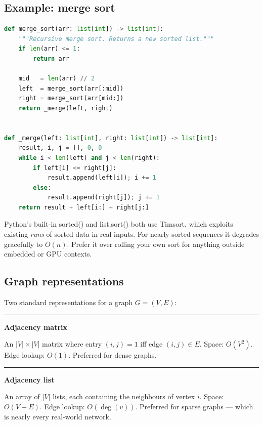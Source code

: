 \documentclass[12pt,a4paper]{article}
\newcommand{\ic}[1]{%
  \mbox{\colorbox{AnthCodeBG}{\footnotesize\ttfamily\textcolor{AnthBlue}{#1}}}%
}
\newcommand{\concept}[1]{%
  \noindent\textcolor{AnthGreen}{\rule{3pt}{10pt}}\enspace
  \textbf{\color{AnthDark}#1}\par\vspace{2pt}%
}
\newenvironment{Tip}[1][Tip]{%
  \begin{tcolorbox}[tipbox, title=#1]}{\end{tcolorbox}}
\begin{document}
\subsection{Example: merge sort}

\begin{tcolorbox}[codebox, title=Merge sort — Python]
\begin{lstlisting}[language=Python]
def merge_sort(arr: list[int]) -> list[int]:
    """Recursive merge sort. Returns a new sorted list."""
    if len(arr) <= 1:
        return arr

    mid   = len(arr) // 2
    left  = merge_sort(arr[:mid])
    right = merge_sort(arr[mid:])
    return _merge(left, right)


def _merge(left: list[int], right: list[int]) -> list[int]:
    result, i, j = [], 0, 0
    while i < len(left) and j < len(right):
        if left[i] <= right[j]:
            result.append(left[i]); i += 1
        else:
            result.append(right[j]); j += 1
    return result + left[i:] + right[j:]
\end{lstlisting}
\end{tcolorbox}

\begin{Tip}[When to use Timsort]
  Python's built-in \ic{sorted()} and \ic{list.sort()} both use Timsort, which
  exploits existing \emph{runs} of sorted data in real inputs. For nearly-sorted
  sequences it degrades gracefully to $O(n)$. Prefer it over rolling your own
  sort for anything outside embedded or GPU contexts.
\end{Tip}

\subsection{Graph representations}

Two standard representations for a graph $G = (V, E)$:

\concept{Adjacency matrix}

An $|V| \times |V|$ matrix where entry $(i, j) = 1$ iff edge $(i, j) \in E$.
Space: $O(V^2)$. Edge lookup: $O(1)$. Preferred for dense graphs.

\concept{Adjacency list}

An array of $|V|$ lists, each containing the neighbours of vertex $i$.
Space: $O(V + E)$. Edge lookup: $O(\deg(v))$. Preferred for sparse graphs —
which is nearly every real-world network.
\end{document}
